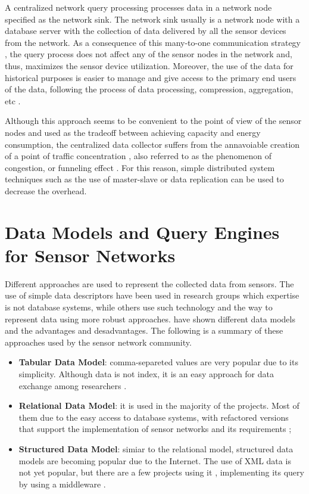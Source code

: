 A centralized network query processing processes data in a network node
specified as the network sink. The network sink usually is a network
node with a database server with the collection of data delivered by
all the sensor devices from the network. As a consequence of this
many-to-one communication strategy \cite{sn-storage02}, the query process does
not affect any of the sensor nodes in the network and, thus, maximizes the
sensor device utilization. Moreover, the use of the data for historical
purposes is easier to manage and give access to the primary end users of the
data, following the process of data processing, compression, aggregation, etc
\cite{sn-db-modeling02}.

Although this approach seems to be convenient to the point of view of the
sensor nodes and used as the tradeoff between achieving capacity and energy
consumption, the centralized data collector suffers from the annavoiable
creation of a point of traffic concentration \cite{sn-storage02}, also referred
to as the phenomenon of congestion, or funneling effect \cite{sn-storage04}.
For this reason, simple distributed system techniques such as the use of
master-slave or data replication can be used to decrease the overhead.

\section{Data Models and Query Engines for Sensor Networks}
\label{sec:data-models}

Different approaches are used to represent the collected data from sensors. The
use of simple data descriptors have been used in research groups which
expertise is not database systems, while others use such technology and the way
to represent data using more robust approaches. \cite{sn-data-model-survey}
have shown different data models and the advantages and desadvantages. The
following is a summary of these approaches used by the sensor network
community.

\begin{itemize}
  \item \textbf{Tabular Data Model}: comma-separeted values are very popular
  due to its simplicity. Although data is not index, it is an easy approach for data
 exchange among researchers \cite{sn-provenance}.
  \item \textbf{Relational Data Model}: it is used in the majority of the
  projects. Most of them due to the easy access to database systems, with
  refactored versions that support the implementation of sensor networks and
  its requirements \cite{sn-db-tinydb};
  \item \textbf{Structured Data Model}: simiar to the relational model,
  structured data models are becoming popular due to the Internet. The use of
  XML data \cite{xml} is not yet popular, but there are a few projects using it
  \cite{sn-xml-usage01}\cite{sn-xml-usage01}, implementing its query by using a
  middleware \cite{sn-xml-middleware} \cite{sn-xml-query-engines}.
\end{itemize}

